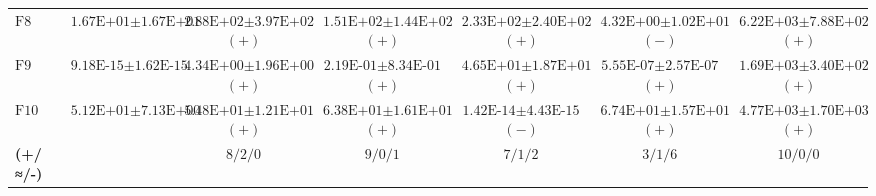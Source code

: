\begin{table}[htbp]
\begin{tabular}{lcccccc}
$\text{F8}$ & $\text{1.67E+01}\pm\text{1.67E+01}$ & $\text{2.88E+02}\pm\text{3.97E+02}$ $(+)$ & $\text{1.51E+02}\pm\text{1.44E+02}$ $(+)$ & $\text{2.33E+02}\pm\text{2.40E+02}$ $(+)$ & $\text{4.32E+00}\pm\text{1.02E+01}$ $(-)$ & $\text{6.22E+03}\pm\text{7.88E+02}$ $(+)$ \\
$\text{F9}$ & $\text{9.18E-15}\pm\text{1.62E-15}$ & $\text{4.34E+00}\pm\text{1.96E+00}$ $(+)$ & $\text{2.19E-01}\pm\text{8.34E-01}$ $(+)$ & $\text{4.65E+01}\pm\text{1.87E+01}$ $(+)$ & $\text{5.55E-07}\pm\text{2.57E-07}$ $(+)$ & $\text{1.69E+03}\pm\text{3.40E+02}$ $(+)$ \\
$\text{F10}$ & $\text{5.12E+01}\pm\text{7.13E+00}$ & $\text{5.48E+01}\pm\text{1.21E+01}$ $(+)$ & $\text{6.38E+01}\pm\text{1.61E+01}$ $(+)$ & $\text{1.42E-14}\pm\text{4.43E-15}$ $(-)$ & $\text{6.74E+01}\pm\text{1.57E+01}$ $(+)$ & $\text{4.77E+03}\pm\text{1.70E+03}$ $(+)$ \\
\textbf{(+/≈/-)} &  & \textbf{$\text{8/2/0}$} & \textbf{$\text{9/0/1}$} & \textbf{$\text{7/1/2}$} & \textbf{$\text{3/1/6}$} & \textbf{$\text{10/0/0}$} \\
\bottomrule
\end{tabular}
\endgroup
\end{table}
